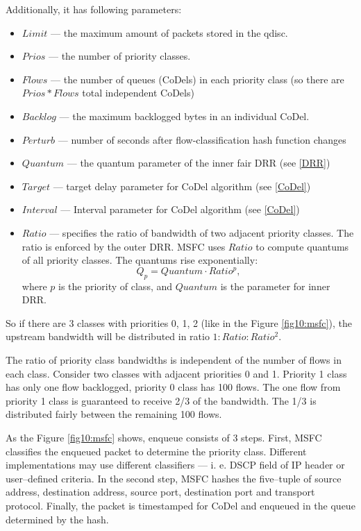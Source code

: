 Additionally, it has following parameters:
\begin{itemize}
	\item $Limit$ --- the maximum amount of packets stored in the qdisc.
	\item $Prios$ --- the number of priority classes.
	\item $Flows$ --- the number of queues (CoDels) in each priority class (so there are $Prios*Flows$ total independent CoDels)
	\item $Backlog$ --- the maximum backlogged bytes in an individual CoDel.
	\item $Perturb$ --- number of seconds after flow-classification hash function changes
	\item $Quantum$ --- the quantum parameter of the inner fair DRR (see \autoref{DRR})
	\item $Target$ --- target delay parameter for CoDel algorithm (see \autoref{CoDel})
	\item $Interval$ --- Interval parameter for CoDel algorithm (see \autoref{CoDel})
	\item $Ratio$ --- specifies the ratio of bandwidth of two adjacent priority classes. The ratio is enforced by the outer DRR. MSFC uses $Ratio$ to compute quantums of all priority classes. The quantums rise exponentially:
	\[
	Q_p = Quantum \cdot Ratio^p,
	\]
	where $p$ is the priority of class, and $Quantum$ is the parameter for inner DRR.
\end{itemize}
So if there are 3 classes with priorities 0, 1, 2 (like in the Figure \ref{fig10:msfc}), the upstream bandwidth will be distributed in ratio $1:Ratio:Ratio^2$.

The ratio of priority class bandwidths is independent of the number of flows in each class. Consider two classes with adjacent priorities 0 and 1. Priority 1 class has only one flow backlogged, priority 0 class has 100 flows. The one flow from priority 1 class is guaranteed to receive 2/3 of the bandwidth. The 1/3 is distributed fairly between the remaining 100 flows.

As the Figure \ref{fig10:msfc} shows, enqueue consists of 3 steps. First, MSFC classifies the enqueued packet to determine the priority class. Different implementations may use different classifiers --- i. e. DSCP field of IP header or user--defined criteria. In the second step, MSFC hashes the five--tuple of source address, destination address, source port, destination port and transport protocol. Finally, the packet is timestamped for CoDel and enqueued in the queue determined by the hash.

